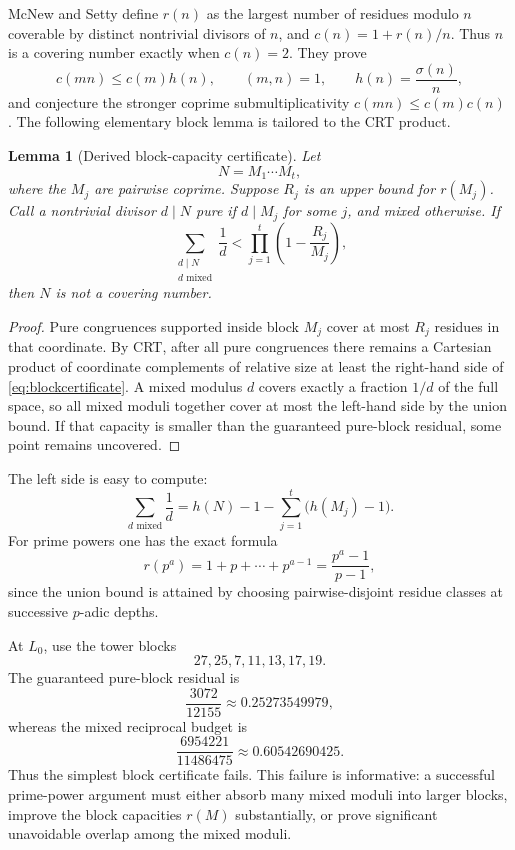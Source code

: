 \documentclass[11pt]{article}
\newtheorem{lemma}[theorem]{Lemma}
\theoremstyle{definition}
\begin{document}
McNew and Setty define $r(n)$ as the largest number of residues modulo $n$ coverable by distinct
nontrivial divisors of $n$, and $c(n)=1+r(n)/n$.  Thus $n$ is a covering number exactly when
$c(n)=2$.  They prove
\[
 c(mn)\le c(m)h(n),\qquad (m,n)=1,
 \qquad h(n)=\frac{\sigma(n)}n,
\]
and conjecture the stronger coprime submultiplicativity $c(mn)\le c(m)c(n)$
\cite{McNewSetty2026}.  The following elementary block lemma is tailored to the CRT product.

\begin{lemma}[Derived block-capacity certificate]\label{lem:block}
Let
\[
 N=M_1\cdots M_t,
\]
where the $M_j$ are pairwise coprime.  Suppose $R_j$ is an upper bound for $r(M_j)$.  Call a
nontrivial divisor $d\mid N$ \emph{pure} if $d\mid M_j$ for some $j$, and \emph{mixed}
otherwise.  If
\begin{equation}\label{eq:blockcertificate}
 \sum_{\substack{d\mid N\\d\text{ mixed}}}\frac1d
 <
 \prod_{j=1}^{t}\left(1-\frac{R_j}{M_j}\right),
\end{equation}
then $N$ is not a covering number.
\end{lemma}

\begin{proof}
Pure congruences supported inside block $M_j$ cover at most $R_j$ residues in that coordinate.
By CRT, after all pure congruences there remains a Cartesian product of coordinate complements
of relative size at least the right-hand side of \eqref{eq:blockcertificate}.  A mixed modulus
$d$ covers exactly a fraction $1/d$ of the full space, so all mixed moduli together cover at
most the left-hand side by the union bound.  If that capacity is smaller than the guaranteed
pure-block residual, some point remains uncovered.
\end{proof}

The left side is easy to compute:
\[
 \sum_{d\text{ mixed}}\frac1d
 =h(N)-1-\sum_{j=1}^{t}\bigl(h(M_j)-1\bigr).
\]
For prime powers one has the exact formula
\[
 r(p^a)=1+p+\cdots+p^{a-1}=\frac{p^a-1}{p-1},
\]
since the union bound is attained by choosing pairwise-disjoint residue classes at successive
$p$-adic depths.

At $L_0$, use the tower blocks
\[
 27,25,7,11,13,17,19.
\]
The guaranteed pure-block residual is
\[
 \frac{3072}{12155}\approx0.25273549979,
\]
whereas the mixed reciprocal budget is
\[
 \frac{6954221}{11486475}\approx0.60542690425.
\]
Thus the simplest block certificate fails.  This failure is informative: a successful
prime-power argument must either absorb many mixed moduli into larger blocks, improve the
block capacities $r(M)$ substantially, or prove significant unavoidable overlap among the
mixed moduli.
\end{document}
